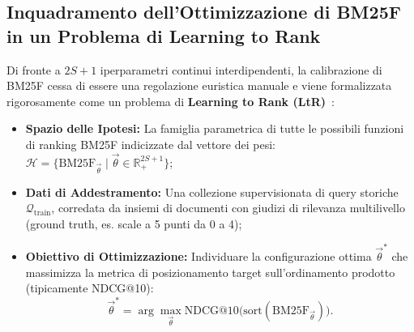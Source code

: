 \FloatBarrier
\subsection{Inquadramento dell'Ottimizzazione di BM25F in un Problema di Learning to Rank}
\label{subsec:bm25f-cast-to-ltr}

Di fronte a $2S+1$ iperparametri continui interdipendenti, la calibrazione di BM25F cessa di essere una regolazione euristica manuale e viene formalizzata rigorosamente come un problema di \textbf{Learning to Rank (LtR)}~\cite{taylor2006}:
\begin{itemize}
    \item \textbf{Spazio delle Ipotesi:} La famiglia parametrica di tutte le possibili funzioni di ranking BM25F indicizzate dal vettore dei pesi: $\mathcal{H} = \{ \text{BM25F}_{\vec{\theta}} \mid \vec{\theta} \in \mathbb{R}_+^{2S+1} \}$;
    \item \textbf{Dati di Addestramento:} Una collezione supervisionata di query storiche $\mathcal{Q}_{\text{train}}$, corredata da insiemi di documenti con giudizi di rilevanza multilivello (ground truth, es. scale a 5 punti da 0 a 4);
    \item \textbf{Obiettivo di Ottimizzazione:} Individuare la configurazione ottima $\vec{\theta}^*$ che massimizza la metrica di posizionamento target sull'ordinamento prodotto (tipicamente NDCG@10):
    \begin{equation}
    \vec{\theta}^* = \arg\max_{\vec{\theta}} \text{NDCG@10}\big( \text{sort}(\text{BM25F}_{\vec{\theta}}) \big).
    \end{equation}
\end{itemize}

